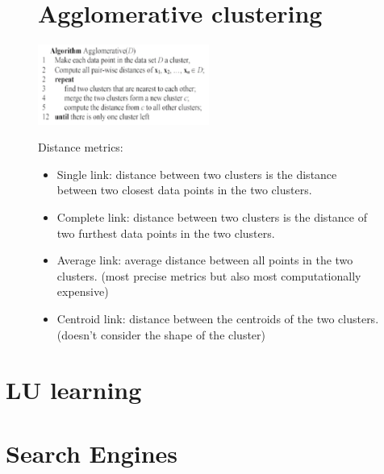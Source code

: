 \documentclass[10pt,oneside,a4paper]{article}
\begin{document}
\begin{figure}[H]
    \centering
    \begin{minipage}{0.5\textwidth}
        \section{Agglomerative clustering}

        \centering
        \includegraphics[width=0.5\textwidth]{Images/Agglomerative_clustering.png}
    \end{minipage}%
    \hfill %
    \begin{minipage}{0.5\textwidth}
        Distance metrics:
        \begin{itemize}
            \item Single link: distance between two clusters is the distance between two closest data points in the two clusters.
            \item Complete link: distance between two clusters is the distance of two furthest data points in the two clusters.
            \item Average link: average distance between all points in the two clusters. (most precise metrics but also most computationally expensive)
            \item Centroid link: distance between the centroids of the two clusters. (doesn't consider the shape of the cluster)
        \end{itemize}

    \end{minipage}
\end{figure}
\begin{figure}[H]

\end{figure}




\section{LU learning}



\section{Search Engines}
\end{document}
